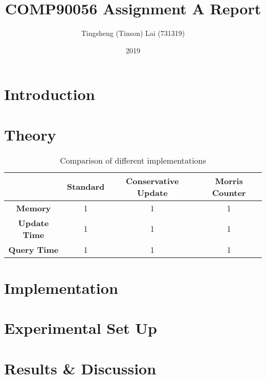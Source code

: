 \documentclass[a4paper]{article}
\title{\textbf{COMP90056 Assignment A Report}}
\author{Tingsheng (Tinson) Lai (731319)}
\date{2019}
\begin{document}
    \maketitle
    \section{Introduction}
    \section{Theory}
        \begin{table}[!h]
            \centering
            \begin{tabular}{|c|c|c|c|}
                \hline
                                     & \textbf{Standard} & \textbf{Conservative Update} & \textbf{Morris Counter} \\ \hline
                \textbf{Memory}      & 1                 & 1                            & 1                       \\ \hline
                \textbf{Update Time} & 1                 & 1                            & 1                       \\ \hline
                \textbf{Query Time}  & 1                 & 1                            & 1                       \\ \hline
            \end{tabular}
            \caption{Comparison of different implementations}
            \label{table:comparison}
        \end{table}
    \section{Implementation}
    \section{Experimental Set Up}
    \section{Results \& Discussion}
\end{document}
